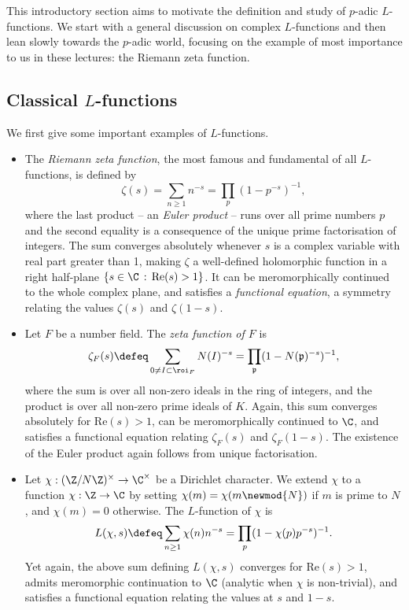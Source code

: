 \documentclass[a4paper,10pt, english, reqno]{smfart}
\numberwithin{equation}{section}
\begin{document}
This introductory section aims to motivate the definition and study of $p$-adic $L$-functions. We start with a general discussion on complex $L$-functions and then lean slowly towards the $p$-adic world, focusing on the example of most importance to us in these lectures: the Riemann zeta function.

\subsection{Classical $L$-functions} \label{subsec:classicalL} We first give some important examples of $L$-functions.

\begin{itemize}
	\item The \emph{Riemann zeta function}, the most famous and fundamental of all $L$-functions, is defined by
	\[
	\zeta(s) = \sum_{n\geq 1}n^{-s} = \prod_{p} (1 - p^{-s})^{-1}, 
	\] 
	where the last product -- an \emph{Euler product} -- runs over all prime numbers $p$ and the second equality is a consequence of the unique prime factorisation of integers. The sum converges absolutely whenever $s$ is a complex variable with real part greater than 1, making $\zeta$ a well-defined holomorphic function in a right half-plane $\{ s \in \C \, : \, \mathrm{Re}(s) > 1\}$. It can be meromorphically continued to the whole complex plane, and satisfies a \emph{functional equation}, a symmetry relating the values $\zeta(s)$ and $\zeta(1-s)$. 
	
	\item Let $F$ be a number field. The \emph{zeta function of $F$} is
	\[
	\zeta_F(s) \defeq \sum_{0\neq I \subset \roi_F}N(I)^{-s} = \prod_{\mathfrak{p}} (1 - N(\mathfrak{p})^{-s})^{-1}, 
	\]
	where the sum is over all non-zero ideals in the ring of integers, and the product is over all non-zero prime ideals of $K$. Again, this sum converges absolutely for $\mathrm{Re}(s) > 1$, can be meromorphically continued to $\C$, and satisfies a functional equation relating $\zeta_F(s)$ and $\zeta_F(1-s)$. The existence of the Euler product again follows from unique factorisation.
	
	
	\item Let $\chi : (\Z/N\Z)^\times \rightarrow \C^\times$ be a Dirichlet character. We extend $\chi$ to a function $\chi : \Z \rightarrow \C$ by setting $\chi(m) = \chi(m \newmod{N})$ if $m$ is prime to $N$, and $\chi(m) = 0$ otherwise. The $L$-function of $\chi$ is
	\[ 
	L(\chi,s) \defeq \sum_{n\geq 1}\chi(n) n^{-s} = \prod_p (1 - \chi(p)p^{-s})^{-1}.
	\]
	Yet again, the above sum defining $L(\chi, s)$ converges for $\mathrm{Re}(s)>1$, admits meromorphic continuation to $\C$ (analytic when $\chi$ is non-trivial), and satisfies a functional equation relating the values at $s$ and $1-s$.
	

\end{itemize}
\end{document}

